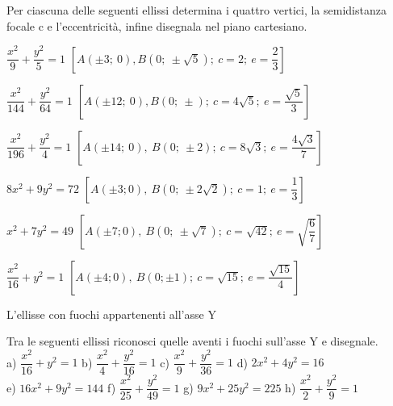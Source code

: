 % 
\begin{esercizio}
  \label{ese:div.003}
  Per ciascuna delle seguenti ellissi determina i quattro vertici, la 
semidistanza focale c e l'eccentricità, infine disegnala nel piano 
cartesiano.
  \begin{enumeratea}
\item $ \dfrac{x^{2}}{9} + \dfrac{y^{2}}{5} =1$  
\hfill $\left[A(\pm3;~0), B\left(0; ~ \pm  \sqrt{5} \right); ~c=2 ;~ e= 
\dfrac{2}{3} \right]$
\item $ \dfrac{x^{2}}{144} + \dfrac{y^{2}}{64} =1$  
\hfill $\left[A(\pm12;~ 0), B(0; ~ \pm ); ~c=4 \sqrt{5}  ;~ e= 
\dfrac{\sqrt{5}}{3} \right]$

\item $ \dfrac{x^{2}}{196} + \dfrac{y^{2}}{4} =1$
\hfill $\left[A(\pm14;~ 0),~ B(0; ~ \pm 2);~ c=8 \sqrt{3}  ;~ e= 
\dfrac{4\sqrt{3}}{7} \right]$

\item $8{x^{2}}+9{y^{2}}=72$
\hfill  $\left[A(\pm3; 0),~ B\left(0;~ \pm 2 \sqrt{2} \right);~c=1; ~e= 
\dfrac{1}{3} \right]$

\item ${x^{2}}+7{y^{2}}=49$
\hfill $\left[A(\pm7; 0),~ B\left(0; ~ \pm  \sqrt{7} \right);~ c= \sqrt{42} 
;~ e= \sqrt{\dfrac{6}{7}} \right]$

\item $ \dfrac{x^{2}}{16} + y^{2} =1$  
\hfill $\left[A(\pm4; 0),~ B(0;  \pm 1);~ c= \sqrt{15}  ;~ e= 
\dfrac{\sqrt{15}}{4} \right]$

  \end{enumeratea}
\end{esercizio}
L'ellisse con fuochi appartenenti all'asse Y
\begin{esercizio}
  \label{ese:div.003}
   Tra le seguenti ellissi riconosci quelle aventi i fuochi sull'asse 
Y e disegnale. \\
a) $ \dfrac{x^{2}}{16} + y^{2} =1$  \hspace{1.5cm} b) $ \dfrac{x^{2}}{4} + 
\dfrac{y^{2}}{16} =1$\hspace{1.5cm}  c) $ \dfrac{x^{2}}{9} + 
\dfrac{y^{2}}{36} =1$\hspace{1.45cm} d) $2 x^{2} +4y^{2} =16$\\
e) $16 x^{2} +9 y^{2} =144$  \hspace{0.7cm} f) $ \dfrac{x^{2}}{25} + 
\dfrac{y^{2}}{49} =1$\hspace{1.6cm}  g) $9 x^{2} +25 y^{2} =225$ 
\hspace{0.6cm} h) $ \dfrac{x^{2}}{2} + \dfrac{y^{2}}{9} =1$ 
\end{esercizio}
